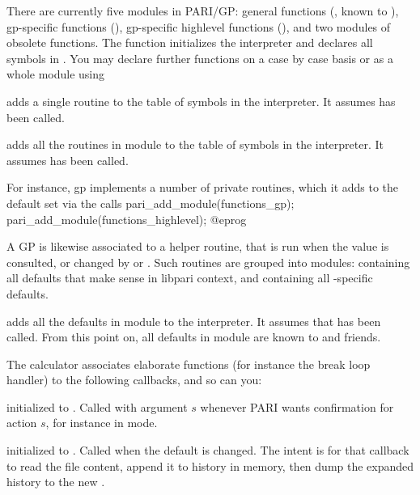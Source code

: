 There are currently five modules in PARI/GP: general functions
(, known to ), gp-specific functions
(), gp-specific highlevel functions
(), and two modules of obsolete functions. The
function  initializes the interpreter and declares all
symbols in . You may declare further functions on a
case by case basis or as a whole module using

 adds a single routine to the
table of symbols in the interpreter. It assumes  has been
called.

 adds all the routines in module
 to the table of symbols in the interpreter. It assumes
 has been called.

\noindent For instance, gp implements a number of private routines, which
it adds to the default set via the calls
\bprog
  pari_add_module(functions_gp);
  pari_add_module(functions_highlevel);
@eprog

A GP  is likewise associated to a helper routine, that is run
when the value is consulted, or changed by  or .
Such routines are grouped into modules:  containing all
defaults that make sense in libpari context, and 
containing all -specific defaults.

 adds all the defaults in
module  to the interpreter. It assumes that  has
been called. From this point on, all defaults in module  are known
to  and friends.


The  calculator associates elaborate functions (for instance the
break loop handler) to the following callbacks, and so can you:

initialized to . Called with argument $s$ whenever PARI wants
confirmation for action $s$, for instance in  mode.

initialized to . Called when the  default
is changed. The intent is for that callback to read the file content, append
it to history in memory, then dump the expanded history to the new
.

